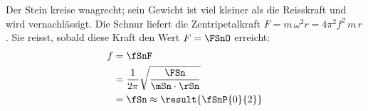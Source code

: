 Der Stein kreise waagrecht; sein Gewicht ist viel kleiner als die Reisskraft und wird vernachlässigt. Die Schnur liefert die Zentripetalkraft $F = m\,\omega^2 r = 4\pi^2 f^2\,m\,r$. Sie reisst, sobald diese Kraft den Wert $F = \FSnO$ erreicht:
\begin{align}
 f &= \fSnF \\
   &= \frac{1}{2\pi}\sqrt{\frac{\FSn}{\mSn\cdot\rSn}} \\
   &= \fSn \approx \result{\fSnP{0}{2}}
\end{align}
